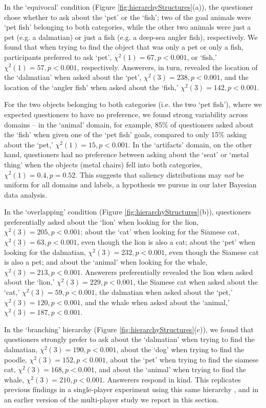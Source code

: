 \documentclass[12pt, floatsintext, jou]{apa6}
\begin{document}
In the `equivocal' condition (Figure \ref{fig:hierarchyStructures}(a)), the questioner chose whether to ask about the `pet' or the `fish'; two of the goal animals were `pet fish' belonging to both categories, while the other two animals were just a pet (e.g. a dalmatian) or just a fish (e.g. a deep-sea angler fish), respectively. We found that when trying to find the object that was only a pet or only a fish, participants preferred to ask `pet', $\chi^2(1) = 67, p < 0.001$, or `fish,' $\chi^2(1) = 57, p < 0.001$, respectively. Answerers, in turn, revealed the location of the `dalmatian' when asked about the `pet', $\chi^2(3) = 238, p < 0.001$, and the location of the `angler fish' when asked about the `fish,' $\chi^2(3) = 142, p < 0.001$. 

For the two objects belonging to both categories (i.e. the two `pet fish'), where we expected questioners to have no preference, we found strong variability across domains -- in the `animal' domain, for example, 85\% of questioners asked about the `fish' when given one of the `pet fish' goals, compared to only 15\% asking about the `pet,' $\chi^2(1) = 15, p < 0.001$. In the `artifacts' domain, on the other hand, questioners had no preference between asking about the `seat' or `metal thing' when the objects (metal chairs) fell into both categories, $\chi^2(1) = 0.4, p = 0.52$. This suggests that saliency distributions may \emph{not} be uniform for all domains and labels, a hypothesis we pursue in our later Bayesian data analysis.

In the `overlapping' condition (Figure \ref{fig:hierarchyStructures}(b)), questioners preferentially asked about the `lion' when looking for the lion, $\chi^2(3) = 205, p < 0.001$; about the `cat' when looking for the Siamese cat, $\chi^2(3) = 63, p < 0.001$, even though the lion is also a cat; about the `pet' when looking for the dalmatian, $\chi^2(3) = 232, p < 0.001$, even though the Siamese cat is also a pet; and about the `animal' when looking for the whale, $\chi^2(3) = 213, p < 0.001$. Answerers preferentially revealed the lion when asked about the `lion,' $\chi^2(3) = 229, p < 0.001$, the Siamese cat when asked about the `cat,' $\chi^2(3) = 59, p < 0.001$, the dalmatian when asked about the `pet,' $\chi^2(3) = 120, p < 0.001$, and the whale when asked about the `animal,' $\chi^2(3) = 187, p < 0.001$. 

In the `branching' hierarchy (Figure \ref{fig:hierarchyStructures}(c)), we found that questioners strongly prefer to ask about the `dalmatian' when trying to find the dalmatian, $\chi^2(3) = 190, p < 0.001$, about the `dog' when trying to find the poodle, $\chi^2(3) = 152, p < 0.001$, about the `pet' when trying to find the siamese cat, $\chi^2(3) = 168, p < 0.001$, and about the `animal' when trying to find the whale, $\chi^2(3) = 210, p < 0.001$. Answerers respond in kind. This replicates previous findings in a single-player experiment using this same hierarchy \cite{HawkinsStuhlmullerDegen15_qAndA}, and in an earlier version of the multi-player study we report in this section.
\end{document}
